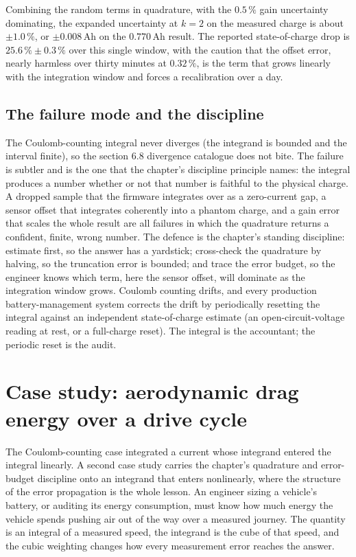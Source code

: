 Combining the random terms in quadrature, with the $0.5\,\%$ gain
uncertainty dominating, the expanded uncertainty at $k = 2$ on the
measured charge is about $\pm 1.0\,\%$, or
$\pm 0.008\,\si{\ampere\hour}$ on the $0.770\,\si{\ampere\hour}$
result. The reported state-of-charge drop is $25.6\,\% \pm 0.3\,\%$
over this single window, with the caution that the offset error,
nearly harmless over thirty minutes at $0.32\,\%$, is the term that
grows linearly with the integration window and forces a recalibration
over a day.

\subsection{The failure mode and the discipline}

The Coulomb-counting integral never diverges (the integrand is bounded
and the interval finite), so the section 6.8 divergence catalogue does
not bite. The failure is subtler and is the one that the
chapter's discipline principle names: the integral produces a number
whether or not that number is faithful to the physical charge. A
dropped sample that the firmware integrates over as a zero-current gap,
a sensor offset that integrates coherently into a phantom charge, and
a gain error that scales the whole result are all failures in which the
quadrature returns a confident, finite, wrong number. The defence is
the chapter's standing discipline: estimate first, so the answer has a
yardstick; cross-check the quadrature by halving, so the truncation
error is bounded; and trace the error budget, so the engineer knows
which term, here the sensor offset, will dominate as the integration
window grows. Coulomb counting drifts, and every production
battery-management system corrects the drift by periodically resetting
the integral against an independent state-of-charge estimate (an
open-circuit-voltage reading at rest, or a full-charge reset). The
integral is the accountant; the periodic reset is the audit.

\section{Case study: aerodynamic drag energy over a drive
cycle}

The Coulomb-counting case integrated a current whose integrand entered
the integral linearly. A second case study carries the chapter's
quadrature and error-budget discipline onto an integrand that enters
nonlinearly, where the structure of the error propagation is the whole
lesson. An engineer sizing a vehicle's battery, or auditing its energy
consumption, must know how much energy the vehicle spends pushing air
out of the way over a measured journey. The quantity is an integral of
a measured speed, the integrand is the cube of that speed, and the
cubic weighting changes how every measurement error reaches the answer.

